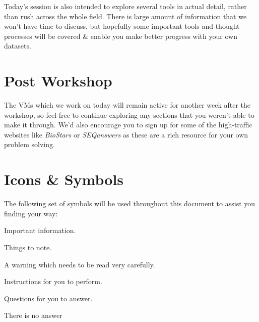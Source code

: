 Today's session is also intended to explore several tools in actual detail, rather than rush across the whole field.
There is large amount of information that we won't have time to discuss, but hopefully some important tools and thought processes will be covered \& enable you make better progress with your own datasets.\\

\section{Post Workshop}
The VMs which we work on today will remain active for another week after the workshop, so feel free to continue exploring any sections that you weren't able to make it through.
We'd also encourage you to sign up for some of the high-traffic websites like \textit{BioStars} or \textit{SEQanswers} as these are a rich resource for your own problem solving.


\section{Icons \& Symbols}
The following set of symbols will be used throughout this document to assist you finding your way: \\

\begin{information}
Important information.\\
\end{information}

\begin{note}
Things to note.\\
\end{note}

\begin{warning}
A warning which needs to be read very carefully.\\
\end{warning}

\begin{steps}
Instructions for you to perform. \\
\end{steps}

\begin{questions}
Questions for you to answer. \\
\begin{answer}
There is no answer
\end{answer}
\end{questions}


